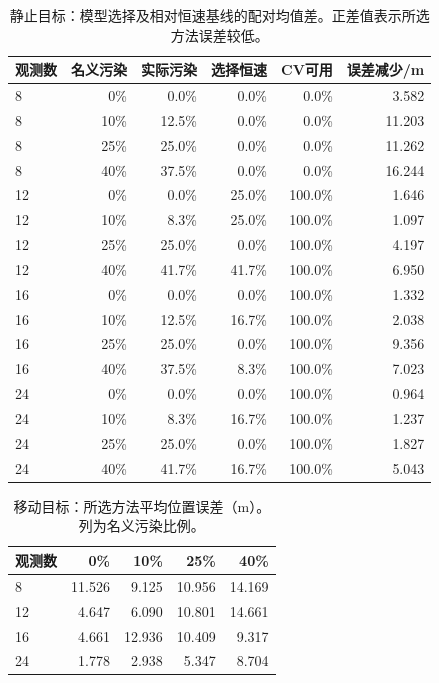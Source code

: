 \begin{table}[H]\centering\small
\caption{静止目标：模型选择及相对恒速基线的配对均值差。正差值表示所选方法误差较低。}

\begin{tabular}{lrrrrr}
\toprule
观测数 & 名义污染 & 实际污染 & 选择恒速 & CV可用 & 误差减少/m\\
\midrule
8 & 0\% & 0.0\% & 0.0\% & 0.0\% & 3.582\\
8 & 10\% & 12.5\% & 0.0\% & 0.0\% & 11.203\\
8 & 25\% & 25.0\% & 0.0\% & 0.0\% & 11.262\\
8 & 40\% & 37.5\% & 0.0\% & 0.0\% & 16.244\\
12 & 0\% & 0.0\% & 25.0\% & 100.0\% & 1.646\\
12 & 10\% & 8.3\% & 25.0\% & 100.0\% & 1.097\\
12 & 25\% & 25.0\% & 0.0\% & 100.0\% & 4.197\\
12 & 40\% & 41.7\% & 41.7\% & 100.0\% & 6.950\\
16 & 0\% & 0.0\% & 0.0\% & 100.0\% & 1.332\\
16 & 10\% & 12.5\% & 16.7\% & 100.0\% & 2.038\\
16 & 25\% & 25.0\% & 0.0\% & 100.0\% & 9.356\\
16 & 40\% & 37.5\% & 8.3\% & 100.0\% & 7.023\\
24 & 0\% & 0.0\% & 0.0\% & 100.0\% & 0.964\\
24 & 10\% & 8.3\% & 16.7\% & 100.0\% & 1.237\\
24 & 25\% & 25.0\% & 0.0\% & 100.0\% & 1.827\\
24 & 40\% & 41.7\% & 16.7\% & 100.0\% & 5.043\\
\bottomrule\end{tabular}\end{table}

\begin{table}[H]\centering\small
\caption{移动目标：所选方法平均位置误差（m）。列为名义污染比例。}

\begin{tabular}{lrrrr}
\toprule
观测数 & 0\% & 10\% & 25\% & 40\%\\
\midrule
8 & 11.526 & 9.125 & 10.956 & 14.169\\
12 & 4.647 & 6.090 & 10.801 & 14.661\\
16 & 4.661 & 12.936 & 10.409 & 9.317\\
24 & 1.778 & 2.938 & 5.347 & 8.704\\
\bottomrule\end{tabular}\end{table}

